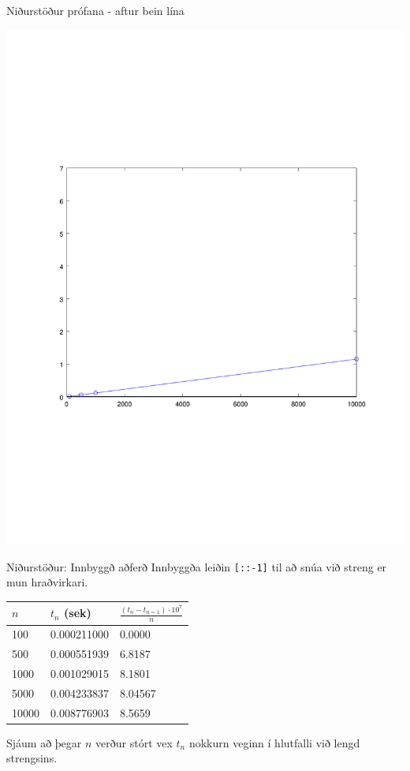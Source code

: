 \documentclass{beamer}
\begin{document}
\begin{frame}{Niðurstöður prófana - aftur bein lína}
\begin{center}
\includegraphics[height=\textheight]{Pics/lineartime2}
\end{center}
\end{frame}

\begin{frame}{Niðurstöður: Innbyggð aðferð}
Innbyggða leiðin \texttt{[::-1]} til að snúa við streng er mun hraðvirkari.

\begin{center}
\begin{tabular}{lll}
\toprule
$n$&$t_n$ (sek)&$\frac{(t_n - t_{n=1})\cdot10^7}{n}$\\
\midrule
100& 0.000211000&0.0000\\
500& 0.000551939&6.8187\\
1000& 0.001029015&8.1801\\
5000& 0.004233837&8.04567\\
10000& 0.008776903&8.5659\\
\bottomrule
\end{tabular}
\end{center}
Sjáum að þegar $n$ verður stórt vex $t_n$ nokkurn veginn í hlutfalli við lengd strengsins.
\end{frame}

\begin{frame}
\end{frame}
\end{document}
